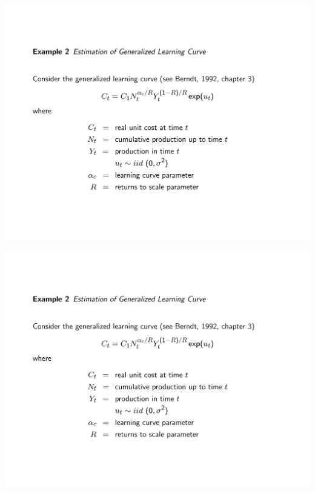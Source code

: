 \begin{frame}[plain]{}
	\includegraphics[page=2,trim={2cm 2cm 2cm 2cm},clip,width=\textwidth]{./resources/zivotLearning.pdf}
\end{frame}

\begin{frame}[plain]{}
	\includegraphics[page=3,trim={2cm 2cm 2cm 2cm},clip,width=\textwidth]{./resources/zivotLearning.pdf}
\end{frame}

